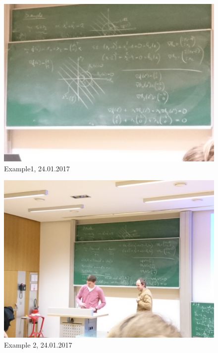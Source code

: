 \documentclass{report}
\begin{document}
\begin{figure}[H]
\includegraphics[width=\textwidth]{2017_01_24-ex1.jpg}
\caption{Example1,  24.01.2017\label{fig:ex1}}
\end{figure}

\begin{figure}[H]
\includegraphics[width=\textwidth]{2017_01_24-ex2.jpg}
\caption{Example 2,  24.01.2017\label{fig:ex2}}
\end{figure}
\end{document}
